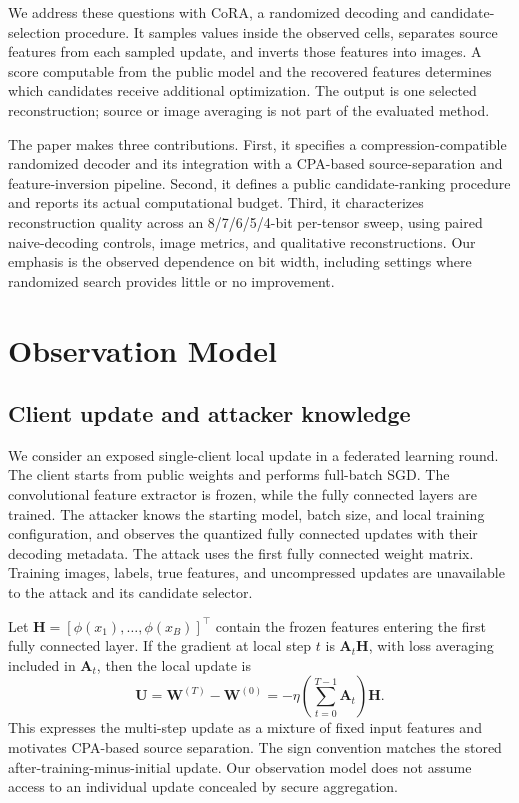 \documentclass[10pt,twocolumn]{article}
\newcommand{\U}{\mathbf{U}}
\newcommand{\HH}{\mathbf{H}}
\newcommand{\cora}{CoRA}
\begin{document}
We address these questions with \cora{}, a randomized decoding and
candidate-selection procedure. It samples values inside the observed
cells, separates source features from each sampled update, and inverts
those features into images. A score computable from the public model and
the recovered features determines which candidates receive additional
optimization. The output is one selected reconstruction; source or image
averaging is not part of the evaluated method.

The paper makes three contributions. First, it specifies a
compression-compatible randomized decoder and its integration with a
CPA-based source-separation and feature-inversion pipeline. Second, it
defines a public candidate-ranking procedure and reports its actual
computational budget. Third, it characterizes reconstruction quality
across an 8/7/6/5/4-bit per-tensor sweep, using paired naive-decoding
controls, image metrics, and qualitative reconstructions. Our emphasis
is the observed dependence on bit width, including settings where
randomized search provides little or no improvement.

\section{Observation Model}
\label{sec:observation}
\subsection{Client update and attacker knowledge}
We consider an exposed single-client local update in a federated learning
round. The client starts from public weights and performs full-batch SGD.
The convolutional feature extractor is frozen, while the fully connected
layers are trained. The attacker knows the starting model, batch size,
and local training configuration, and observes the quantized fully
connected updates with their decoding metadata. The attack uses the
first fully connected weight matrix. Training images, labels, true
features, and uncompressed updates are unavailable to the attack and its
candidate selector.

Let $\HH=[\phi(x_1),\ldots,\phi(x_B)]^\top$ contain the frozen features
entering the first fully connected layer. If the gradient at local step
$t$ is $\mathbf{A}_t\HH$, with loss averaging included in
$\mathbf{A}_t$, then the local update is
\begin{equation}
 \U=\mathbf{W}^{(T)}-\mathbf{W}^{(0)}
     =-\eta\left(\sum_{t=0}^{T-1}\mathbf{A}_t\right)\HH.
 \label{eq:mixture}
\end{equation}
This expresses the multi-step update as a mixture of fixed input
features and motivates CPA-based source separation. The sign convention
matches the stored after-training-minus-initial update. Our observation
model does not assume access to an individual update concealed by secure
aggregation.
\end{document}
